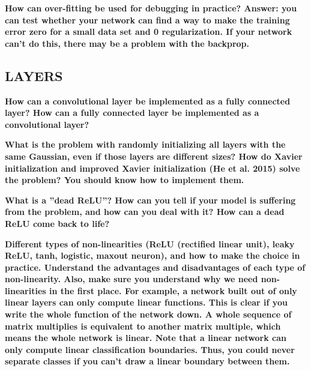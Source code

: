 \documentclass[10pt,letterpaper]{article}
\begin{document}
\subitem \textbf{ How can over-fitting be used for debugging in practice? Answer: you can test whether your network can find a way to make the training error zero for a small data set and 0 regularization. If your network can’t do this, there may be a problem with the backprop. }
\begin{solution}
\end{solution}

\subsection{LAYERS}


\subitem \textbf{ How can a convolutional layer be implemented as a fully connected layer? How can a fully connected layer be implemented as a convolutional layer?}
\begin{solution}
\end{solution}

\subitem \textbf{ What is the problem with randomly initializing all layers with the same Gaussian, even if those layers are different sizes? How do Xavier initialization and improved Xavier initialization (He et al. 2015) solve the problem? You should know how to implement them.}
\begin{solution}
\end{solution}

\subitem \textbf{ What is a ”dead ReLU”? How can you tell if your model is suffering from the problem, and how can you deal with it? How can a dead ReLU come back to life?}
\begin{solution}
\end{solution}

\subitem \textbf{ Different types of non-linearities (ReLU (rectified linear unit), leaky ReLU, tanh, logistic, maxout neuron), and how to make the choice in practice. Understand the advantages and disadvantages of each type of non-linearity. Also, make sure you understand why we need non-linearities in the first place. For example, a network built out of only linear layers can only compute linear functions. This is clear if you write the whole function of the network down. A whole sequence of matrix multiplies is equivalent to another matrix multiple, which means the whole network is linear. Note that a linear network can only compute linear classification boundaries. Thus, you could never separate classes if you can’t draw a linear boundary between them.}
\begin{solution}
\end{solution}
\end{document}
